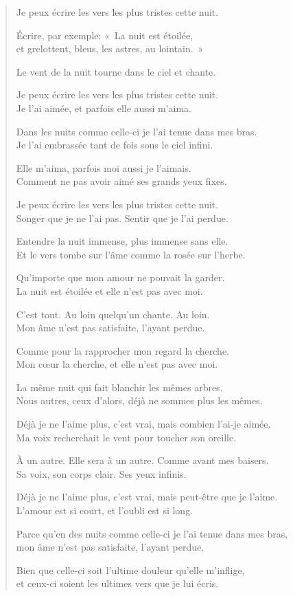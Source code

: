 \documentclass[11pt,a4paper]{book}
\begin{document}
\begin{verse}
  Je peux écrire les vers les plus tristes cette nuit.

  Écrire, par exemple: «~La nuit est étoilée, \\
  et grelottent, bleus, les astres, au lointain.~»

  Le vent de la nuit tourne dans le ciel et chante.

  Je peux écrire les vers les plus tristes cette nuit. \\
  Je l'ai aimée, et parfois elle aussi m'aima.

  Dans les nuits comme celle-ci je l'ai tenue dans mes bras. \\
  Je l'ai embrassée tant de fois sous le ciel infini.

  Elle m'aima, parfois moi aussi je l'aimais. \\
  Comment ne pas avoir aimé ses grands yeux fixes.

  Je peux écrire les vers les plus tristes cette nuit. \\
  Songer que je ne l'ai pas. Sentir que je l'ai perdue.

  Entendre la nuit immense, plus immense sans elle. \\
  Et le vers tombe sur l'âme comme la rosée sur l'herbe.

  Qu'importe que mon amour ne pouvait la garder. \\
  La nuit est étoilée et elle n'est pas avec moi.

  C'est tout. Au loin quelqu'un chante. Au loin. \\
  Mon âme n'est pas satisfaite, l'ayant perdue.

  Comme pour la rapprocher mon regard la cherche. \\
  Mon cœur la cherche, et elle n'est pas avec moi.

  La même nuit qui fait blanchir les mêmes arbres. \\
  Nous autres, ceux d'alors, déjà ne sommes plus les mêmes.

  Déjà je ne l'aime plus, c'est vrai, mais combien l'ai-je aimée. \\
  Ma voix recherchait le vent pour toucher son oreille.

  À un autre. Elle sera à un autre. Comme avant mes baisers. \\
  Sa voix, son corps clair. Ses yeux infinis.

  Déjà je ne l'aime plus, c'est vrai, mais peut-être que je l'aime. \\
  L'amour est si court, et l'oubli est si long.

  Parce qu'en des nuits comme celle-ci je l'ai tenue dans mes bras, \\
  mon âme n'est pas satisfaite, l'ayant perdue.

  Bien que celle-ci soit l'ultime douleur qu'elle m'inflige, \\
  et ceux-ci soient les ultimes vers que je lui écris.
\end{verse}
\end{document}
